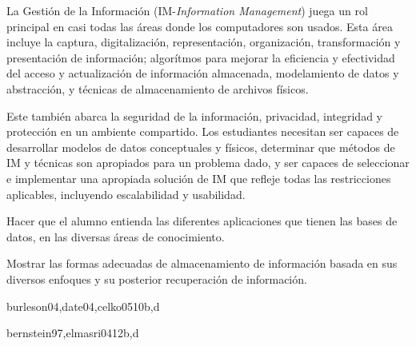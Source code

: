 \begin{syllabus}


\begin{justification}
La Gestión de la Información (IM-\textit{Information Management}) juega un rol principal en casi todas las áreas donde los computadores son usados. Esta área incluye la captura, digitalización, representación, organización, transformación y presentación de información; algorítmos para mejorar la eficiencia y efectividad del acceso y actualización de información almacenada, modelamiento de datos y abstracción, y técnicas de almacenamiento de archivos físicos.

Este también abarca la seguridad de la información, privacidad, integridad y protección en un ambiente compartido. Los estudiantes necesitan ser capaces de desarrollar modelos de datos conceptuales y físicos, determinar que métodos de IM y técnicas son apropiados para un problema dado, y ser capaces de seleccionar e implementar una apropiada solución de IM que refleje todas las restricciones aplicables, incluyendo escalabilidad y usabilidad.
\end{justification}

\begin{goals}
\item Hacer que el alumno entienda las diferentes aplicaciones que tienen las bases de datos, en las diversas áreas de conocimiento.
\item Mostrar las formas adecuadas de almacenamiento de información basada en sus diversos enfoques y su posterior recuperación de información.
\end{goals}

\begin{outcomes}
\end{outcomes}

\begin{unit}{\IMPhysicalDatabaseDesign}{}{burleson04,date04,celko05}{10}{b,d}
    \IMPhysicalDatabaseDesignAllTopics%
    \IMPhysicalDatabaseDesignAllLearningOutcomes
\end{unit}

\begin{unit}{\IMTransactionProcessing}{}{bernstein97,elmasri04}{12}{b,d}
    \IMTransactionProcessingAllTopics
    \IMTransactionProcessingAllLearningOutcomes
\end{unit}


\end{syllabus}
